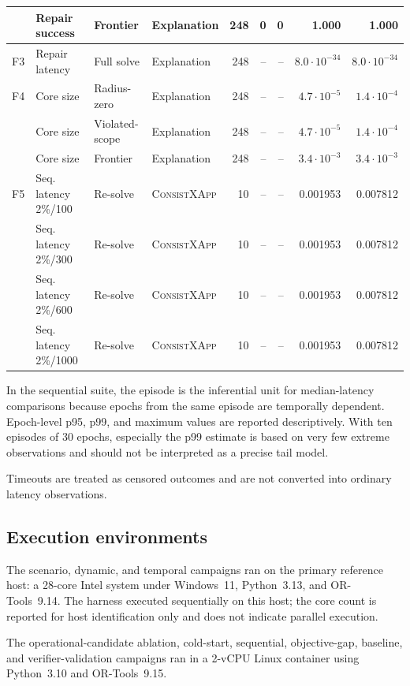 \documentclass[pdflatex,sn-mathphys-num,iicol,oneside]{sn-jnl}
\newcommand{\method}{\textsc{ConsistXApp}\xspace}
\begin{document}
\begin{table}[t]
\begin{tabular}{llllrrrrr}
   & Repair success & Frontier & Explanation & 248 & 0 & 0 & 1.000 & 1.000 \\
\midrule
F3 & Repair latency & Full solve & Explanation & 248 & -- & -- & $8.0\cdot 10^{-34}$ & $8.0\cdot 10^{-34}$ \\
\midrule
F4 & Core size & Radius-zero & Explanation & 248 & -- & -- & $4.7\cdot 10^{-5}$ & $1.4\cdot 10^{-4}$ \\
   & Core size & Violated-scope & Explanation & 248 & -- & -- & $4.7\cdot 10^{-5}$ & $1.4\cdot 10^{-4}$ \\
   & Core size & Frontier & Explanation & 248 & -- & -- & $3.4\cdot 10^{-3}$ & $3.4\cdot 10^{-3}$ \\
\midrule
F5 & Seq. latency 2\%/100 & Re-solve & \method & 10 & -- & -- & 0.001953 & 0.007812 \\
   & Seq. latency 2\%/300 & Re-solve & \method & 10 & -- & -- & 0.001953 & 0.007812 \\
   & Seq. latency 2\%/600 & Re-solve & \method & 10 & -- & -- & 0.001953 & 0.007812 \\
   & Seq. latency 2\%/1000 & Re-solve & \method & 10 & -- & -- & 0.001953 & 0.007812 \\
\bottomrule
\end{tabular}
\end{table}

In the sequential suite, the episode is the inferential unit for
median-latency comparisons because epochs from the same episode are
temporally dependent. Epoch-level p95, p99, and maximum values are
reported descriptively. With ten episodes of 30 epochs, especially
the p99 estimate is based on very few extreme observations and should
not be interpreted as a precise tail model.

Timeouts are treated as censored outcomes and are not converted into
ordinary latency observations.

\subsection{Execution environments}

The scenario, dynamic, and temporal campaigns ran on the primary
reference host: a 28-core Intel system under Windows~11, Python~3.13,
and OR-Tools~9.14. The harness executed sequentially on this host;
the core count is reported for host identification only and does not
indicate parallel execution.

The operational-candidate ablation, cold-start, sequential,
objective-gap, baseline, and verifier-validation campaigns ran in a
2-vCPU Linux container using Python~3.10 and OR-Tools~9.15.
\end{document}
